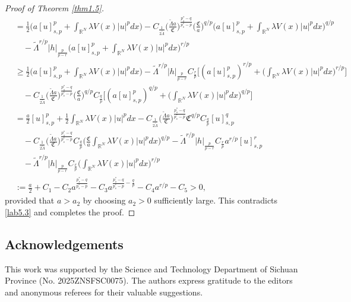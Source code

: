 \documentclass[reqno]{amsart}
\begin{document}
\begin{proof}[Proof of Theorem \ref{thm1.5}]
\begin{align*}
&=\frac{1}{2}\Big(a[u]^p_{s,p}+\int_{\mathbb{R}^N}\lambda V(x)|u|^pdx\Big)
 -C_{\frac{1}{2\widetilde{\Lambda}}}
 \Big(\frac{\widetilde{\Lambda}a}{\mathfrak{C}}\Big)^{\frac{p_s^*-q}{p_s^*-p}} 
 \Big(\frac{\mathfrak{C}}{a}\Big)^{q/p}\Big(a[u]^p_{s,p}
 +\int_{\mathbb{R}^N}\lambda V(x)|u|^pdx\Big)^{q/p}  \\
&\quad -\widetilde{\Lambda}^{r/p}|h|_{\frac{p}{p-r}}\Big(a[u]^p_{s,p}
 +\int_{\mathbb{R}^N}\lambda V(x)|u|^pdx\Big)^{r/p}  \\
&\geq\frac{1}{2}\Big(a[u]^p_{s,p}+\int_{\mathbb{R}^N}\lambda V(x)|u|^pdx\Big)
 -\widetilde{\Lambda}^{r/p}|h|_{\frac{p}{p-r}}C_{\frac{r}{p}}\Big[(a[u]^p_{s,p})^{r/p}
 +\Big(\int_{\mathbb{R}^N}\lambda V(x)|u|^pdx\Big)^{r/p}\Big]  \\
&\quad-C_{\frac{1}{2\widetilde{\Lambda}}}
 \Big(\frac{\widetilde{\Lambda}a}{\mathfrak{C}}\Big)^{\frac{p_s^*-q}{p_s^*-p}}
 \Big(\frac{\mathfrak{C}}{a}\Big)^{q/p}C_{\frac{q}{p}}
 \Big[(a[u]^p_{s,p})^{q/p}+\Big(\int_{\mathbb{R}^N}\lambda V(x)|u|^pdx
 \Big)^{q/p}\Big]  \\
&=\frac{a}{2}[u]^p_{s,p}+\frac{1}{2}\int_{\mathbb{R}^N}\lambda V(x)|u|^pdx
 -C_{\frac{1}{2\widetilde{\Lambda}}}
 \Big(\frac{\widetilde{\Lambda}a}{\mathfrak{C}}\Big)^{\frac{p_s^*-q}{p_s^*-p}}
 \mathfrak{C}^{q/p}C_{\frac{q}{p}}[u]^q_{s,p}  \\
&\quad-C_{\frac{1}{2\widetilde{\Lambda}}}
 \Big(\frac{\widetilde{\Lambda}a}{\mathfrak{C}}\Big)^{\frac{p_s^*-q}{p_s^*-p}}
 C_{\frac{q}{p}}\Big(\frac{\mathfrak{C}}{a}
 \int_{\mathbb{R}^N}\lambda V(x)|u|^pdx\Big)^{q/p}
 -\widetilde{\Lambda}^{r/p}|h|_{\frac{p}{p-r}}C_{\frac{r}{p}}a^{r/p}[u]^r_{s,p}  \\
&\quad -\widetilde{\Lambda}^{r/p}|h|_{\frac{p}{p-r}}C_{\frac{r}{p}}
 \Big(\int_{\mathbb{R}^N}\lambda V(x)|u|^pdx\Big)^{r/p}  \\
&:=\frac{a}{2}+C_1-C_2a^{\frac{p_s^*-q}{p_s^*-p}}-C_3a^{\frac{p_s^*-q}{p_s^*-p}
 -\frac{q}{p}}-C_4a^{r/p}-C_5 
>0,
\end{align*}
provided that $a>a_2$ by choosing $a_2>0$ sufficiently large. 
This contradicts \eqref{lab5.3} and completes the proof.
\end{proof}

\subsection*{Acknowledgements}
This work was supported by the Science and Technology Department of 
Sichuan Province (No. 2025ZNSFSC0075). The authors express gratitude to the 
editors and anonymous referees for their valuable suggestions.
\end{document}

